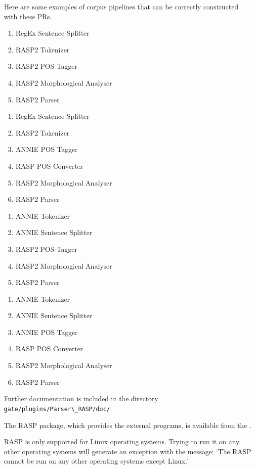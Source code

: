 Here are some examples of corpus pipelines that can be correctly
constructed with these PRs.
\begin{enumerate}
\item RegEx Sentence Splitter
\item RASP2 Tokenizer
\item RASP2 POS Tagger
\item RASP2 Morphological Analyser
\item RASP2 Parser
\end{enumerate}
%
\begin{enumerate}
\item RegEx Sentence Splitter
\item RASP2 Tokenizer
\item ANNIE POS Tagger
\item RASP POS Converter
\item RASP2 Morphological Analyser
\item RASP2 Parser
\end{enumerate}
%
\begin{enumerate}
\item ANNIE Tokenizer
\item ANNIE Sentence Splitter
\item RASP2 POS Tagger
\item RASP2 Morphological Analyser
\item RASP2 Parser
\end{enumerate}
%
\begin{enumerate}
\item ANNIE Tokenizer
\item ANNIE Sentence Splitter
\item ANNIE POS Tagger
\item RASP POS Converter
\item RASP2 Morphological Analyser
\item RASP2 Parser
\end{enumerate}




Further documentation is included in the directory
\verb!gate/plugins/Parser\_RASP/doc/!.


The RASP package, which provides the external programs, is available
from the
.

RASP is only supported for Linux operating systems. Trying to run it
on any other operating systems will generate an exception with the
message: `The RASP cannot be run on any other operating systems
except Linux.'

